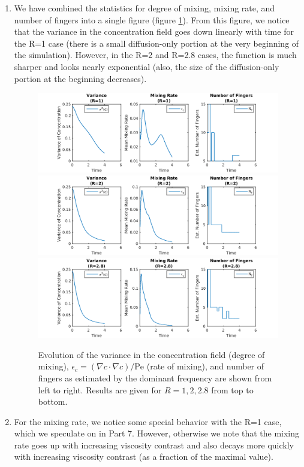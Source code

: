 \documentclass{article}
\begin{document}
\begin{enumerate}
\item We have combined the statistics for degree of mixing, mixing rate, and number of fingers into a single figure (figure \ref{fig:concstats}).
From this figure, we notice that the variance in the concentration field goes down linearly with time for the R=1 case (there is a small diffusion-only portion at the very beginning of the simulation).
However, in the R=2 and R=2.8 cases, the function is much sharper and looks nearly exponential (also, the size of the diffusion-only portion at the beginning decreases).
\begin{figure}[!ht]
\centering
\includegraphics[scale=0.7]{concstats_10.png}
\includegraphics[scale=0.7]{concstats_20.png}
\includegraphics[scale=0.7]{concstats_28.png}
\caption{Evolution of the variance in the concentration field (degree of mixing), $\epsilon_c = (\nabla c \cdot \nabla c) / \mathrm{Pe}$ (rate of mixing), and number of fingers as estimated by the dominant frequency are shown from left to right. Results are given for $R=1, 2, 2.8$ from top to bottom.}
\label{fig:concstats}
\end{figure}

\item For the mixing rate, we notice some special behavior with the R=1 case, which we speculate on in Part 7.
However, otherwise we note that the mixing rate goes up with increasing viscosity contrast and also decays more quickly with increasing viscosity contrast (as a fraction of the maximal value).


\end{enumerate}
\end{document}
